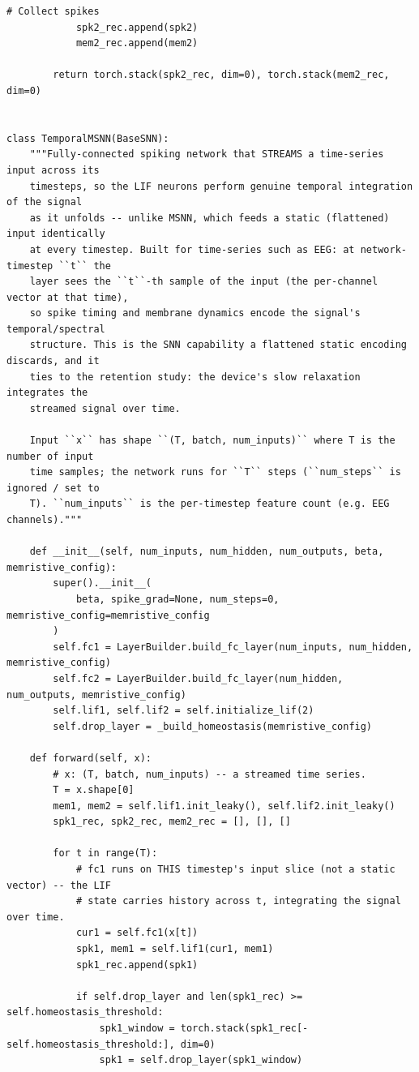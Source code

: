 \begin{lstlisting}[caption={mnn\_torch/models.py},label={lst:mnn-src-models}]
            # Collect spikes
            spk2_rec.append(spk2)
            mem2_rec.append(mem2)

        return torch.stack(spk2_rec, dim=0), torch.stack(mem2_rec, dim=0)


class TemporalMSNN(BaseSNN):
    """Fully-connected spiking network that STREAMS a time-series input across its
    timesteps, so the LIF neurons perform genuine temporal integration of the signal
    as it unfolds -- unlike MSNN, which feeds a static (flattened) input identically
    at every timestep. Built for time-series such as EEG: at network-timestep ``t`` the
    layer sees the ``t``-th sample of the input (the per-channel vector at that time),
    so spike timing and membrane dynamics encode the signal's temporal/spectral
    structure. This is the SNN capability a flattened static encoding discards, and it
    ties to the retention study: the device's slow relaxation integrates the
    streamed signal over time.

    Input ``x`` has shape ``(T, batch, num_inputs)`` where T is the number of input
    time samples; the network runs for ``T`` steps (``num_steps`` is ignored / set to
    T). ``num_inputs`` is the per-timestep feature count (e.g. EEG channels)."""

    def __init__(self, num_inputs, num_hidden, num_outputs, beta, memristive_config):
        super().__init__(
            beta, spike_grad=None, num_steps=0, memristive_config=memristive_config
        )
        self.fc1 = LayerBuilder.build_fc_layer(num_inputs, num_hidden, memristive_config)
        self.fc2 = LayerBuilder.build_fc_layer(num_hidden, num_outputs, memristive_config)
        self.lif1, self.lif2 = self.initialize_lif(2)
        self.drop_layer = _build_homeostasis(memristive_config)

    def forward(self, x):
        # x: (T, batch, num_inputs) -- a streamed time series.
        T = x.shape[0]
        mem1, mem2 = self.lif1.init_leaky(), self.lif2.init_leaky()
        spk1_rec, spk2_rec, mem2_rec = [], [], []

        for t in range(T):
            # fc1 runs on THIS timestep's input slice (not a static vector) -- the LIF
            # state carries history across t, integrating the signal over time.
            cur1 = self.fc1(x[t])
            spk1, mem1 = self.lif1(cur1, mem1)
            spk1_rec.append(spk1)

            if self.drop_layer and len(spk1_rec) >= self.homeostasis_threshold:
                spk1_window = torch.stack(spk1_rec[-self.homeostasis_threshold:], dim=0)
                spk1 = self.drop_layer(spk1_window)


\end{lstlisting}
